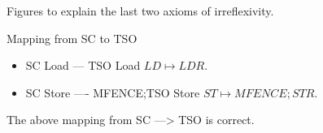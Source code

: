 \documentclass[xcolor={dvipsnames}, notes]{beamer}
\begin{document}
    \begin{frame}{Figures to explain the last two axioms of irreflexivity.}
            
        \begin{figure}
        \end{figure}

        \begin{figure}
        \end{figure}

    \end{frame}
    

    \begin{frame}{Mapping from SC to TSO}

        \begin{itemize}
            \item SC Load --- TSO Load $LD \mapsto LDR$.
            \item SC Store ---- MFENCE;TSO Store $ST \mapsto MFENCE;STR$.
        \end{itemize}

            The above mapping from SC ---> TSO is correct.
        
    \end{frame}
\end{document}
